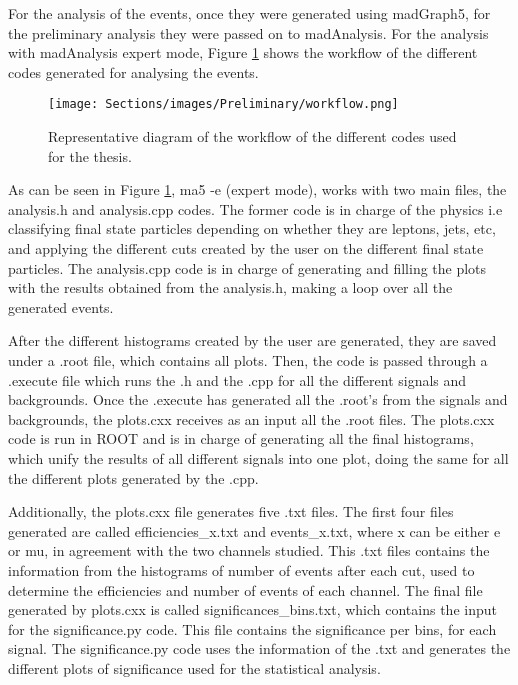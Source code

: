 For the analysis of the events, once they were generated using madGraph5, for the preliminary analysis they were passed on to madAnalysis. For the analysis with madAnalysis expert mode, Figure \ref{workflow} shows the workflow of the different codes generated for analysing the events.

\begin{figure}[ht!]
    \centering
    \texttt{[image: Sections/images/Preliminary/workflow.png]}
    \caption{Representative diagram of the workflow of the different codes used for the thesis.}
    \label{workflow}
\end{figure}

As can be seen in Figure \ref{workflow}, ma5 -e (expert mode), works with two main files, the analysis.h and analysis.cpp codes. The former code is in charge of the physics i.e classifying final state particles depending on whether they are leptons, jets, etc, and applying the different cuts created by the user on the different final state particles. The analysis.cpp code is in charge of generating and filling the plots with the results obtained from the analysis.h, making a loop over all the generated events.

After the different histograms created by the user are generated, they are saved under a .root file, which contains all plots. Then, the code is passed through a .execute file which runs the .h and the .cpp for all the different signals and backgrounds. Once the .execute has generated all the .root's from the signals and backgrounds, the plots.cxx receives as an input all the .root files. The plots.cxx code is run in ROOT and is in charge of generating all the final histograms, which unify the results of all different signals into one plot, doing the same for all the different plots generated by the .cpp.

Additionally, the plots.cxx file generates five .txt files. The first four files generated are called efficiencies\_x.txt and events\_x.txt, where x can be either e or mu, in agreement with the two channels studied. This .txt files contains the information from the histograms of number of events after each cut, used to determine the efficiencies and number of events of each channel. The final file generated by plots.cxx is called significances\_bins.txt, which contains the input for the significance.py code. This file contains the significance per bins, for each signal. The significance.py code uses the information of the .txt and generates the different plots of significance used for the statistical analysis.
